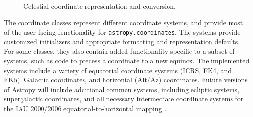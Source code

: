 \documentclass[traditabstract]{aa}
\begin{document}
\begin{figure}
\center
\caption{Celestial coordinate representation and conversion.\label{code:coords}}
\vspace{0.1in}
\label{fig:code_coordinates}
\end{figure}

The coordinate classes represent different coordinate systems, and
provide most of the user-facing functionality for
\texttt{astropy.coordinates}. The systems provide customized initializers and
appropriate formatting and representation defaults. For some classes, they
also contain added functionality specific to a subset of systems, such as code
to precess a coordinate to a new equinox. The implemented systems include a
variety of equatorial coordinate systems (ICRS, FK4, and FK5), Galactic
coordinates, and horizontal (Alt/Az) coordinates. Future versions of Astropy
will include additional common systems, including ecliptic systems,
supergalactic coordinates, and all necessary intermediate coordinate systems
for the IAU 2000/2006 equatorial-to-horizontal mapping
\citep[e.g.,][]{soffel03, usnocircular179}.
\end{document}
